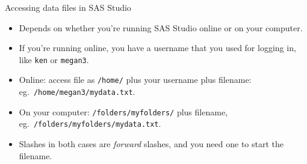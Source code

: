 \documentclass[unknownkeysallowed]{beamer}\usepackage[]{graphicx}\usepackage[]{color}
\begin{document}
\begin{frame}[fragile]{Accessing data files in SAS Studio}

    \begin{itemize}
    \item Depends on whether you're running SAS Studio online or on
      your computer.
    \item If you're running online, you have a username that you used
      for logging in, like \texttt{ken} or \texttt{megan3}.
    \item Online: access file as \texttt{/home/} plus your username
      plus filename: eg.\ \texttt{/home/megan3/mydata.txt}.
    \item On your computer: \texttt{/folders/myfolders/} plus
      filename, eg.\ \texttt{/folders/myfolders/mydata.txt}.
    \item Slashes in both cases are \emph{forward} slashes, and you
      need one to start the filename.
    \end{itemize}
    
\end{frame}
\end{document}
